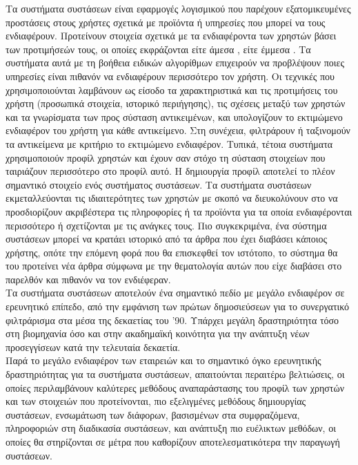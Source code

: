 Τα συστήματα συστάσεων είναι εφαρμογές λογισμικού που παρέχουν εξατομικευμένες
προστάσεις στους χρήστες σχετικά με προϊόντα ή υπηρεσίες που μπορεί να τους
ενδιαφέρουν. Προτείνουν στοιχεία σχετικά με τα ενδιαφέροντα των χρηστών βάσει
των προτιμήσεών τους, οι οποίες εκφράζονται είτε άμεσα {}, είτε έμμεσα {}.
Τα συστήματα αυτά με τη βοήθεια ειδικών αλγορίθμων επιχειρούν να προβλέψουν
ποιες υπηρεσίες είναι πιθανόν να ενδιαφέρουν περισσότερο τον χρήστη. Οι τεχνικές
που χρησιμοποιούνται λαμβάνουν ως είσοδο τα χαρακτηριστικά και τις προτιμήσεις
του χρήστη (προσωπικά στοιχεία, ιστορικό περιήγησης), τις σχέσεις μεταξύ των
χρηστών και τα γνωρίσματα των προς σύσταση αντικειμένων, και υπολογίζουν το
εκτιμώμενο ενδιαφέρον του χρήστη για κάθε αντικείμενο. Στη συνέχεια, φιλτράρουν ή
ταξινομούν τα αντικείμενα με κριτήριο το εκτιμώμενο ενδιαφέρον. Τυπικά, τέτοια
συστήματα χρησιμοποιούν προφίλ χρηστών και έχουν σαν στόχο τη σύσταση στοιχείων
που ταιριάζουν περισσότερο στο προφίλ αυτό. Η δημιουργία προφίλ αποτελεί το πλέον
σημαντικό στοιχείο ενός συστήματος συστάσεων. Τα συστήματα συστάσεων
εκμεταλλεύονται τις ιδιαιτερότητες των χρηστών με σκοπό να διευκολύνουν στο να
προσδιορίζουν ακριβέστερα τις πληροφορίες ή τα προϊόντα για τα οποία
ενδιαφέρονται περισσότερο ή σχετίζονται με τις ανάγκες τους. Πιο συγκεκριμένα, ένα
σύστημα συστάσεων μπορεί να κρατάει ιστορικό από τα άρθρα που έχει διαβάσει
κάποιος χρήστης, οπότε την επόμενη φορά που θα επισκεφθεί τον ιστότοπο, το
σύστημα θα του προτείνει νέα άρθρα σύμφωνα με την θεματολογία αυτών που είχε
διαβάσει στο παρελθόν και πιθανόν να τον ενδιέφεραν. \\
Τα συστήματα συστάσεων αποτελούν ένα σημαντικό πεδίο με μεγάλο ενδιαφέρον σε
ερευνητικό επίπεδο, από την εμφάνιση των πρώτων δημοσιεύσεων για το συνεργατικό
φιλτράρισμα στα μέσα της δεκαετίας του '90. Υπάρχει μεγάλη δραστηριότητα τόσο στη
βιομηχανία όσο και στην ακαδημαϊκή κοινότητα για την ανάπτυξη νέων προσεγγίσεων κατά
την τελευταία δεκαετία. \\
Παρά το μεγάλο ενδιαφέρον των εταιρειών και το σημαντικό όγκο ερευνητικής δραστηριότητας
για τα συστήματα συστάσεων, απαιτούνται περαιτέρω βελτιώσεις, 
οι οποίες περιλαμβάνουν καλύτερες μεθόδους αναπαράστασης του προφίλ των χρηστών 
και των στοιχειών που προτείνονται, πιο εξελιγμένες μεθόδους δημιουργίας συστάσεων, 
ενσωμάτωση των διάφορων, βασισμένων στα συμφραζόμενα, πληροφοριών στη διαδικασία συστάσεων,
και ανάπτυξη πιο ευέλικτων μεθόδων, οι οποίες θα στηρίζονται σε μέτρα που
καθορίζουν αποτελεσματικότερα την παραγωγή συστάσεων.

